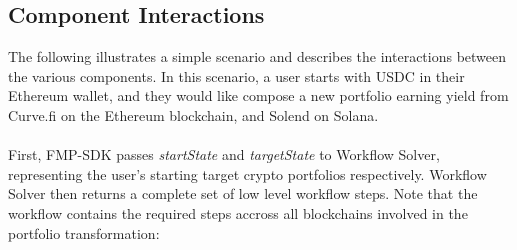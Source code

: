 \documentclass[oneside]{article}
\begin{document}
\subsection*{Component Interactions}

The following illustrates a simple scenario and describes the interactions between the various components.  
In this scenario, a user starts with USDC in their Ethereum wallet, and they would like compose a new portfolio earning yield from Curve.fi on the Ethereum blockchain, and Solend on Solana.
\\
\\
First, FMP-SDK passes \emph{startState} and \emph{targetState} to Workflow Solver, representing the user's starting target crypto portfolios respectively.  Workflow Solver then returns a complete set of low level workflow steps.  Note that the workflow contains the required steps accross all blockchains involved in the portfolio transformation:

\end{document}

